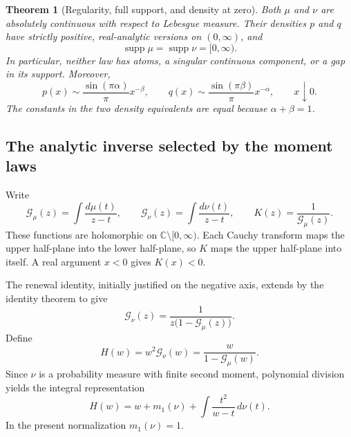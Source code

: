 \documentclass[11pt]{article}
\numberwithin{equation}{section}
\newtheorem{theorem}{Theorem}[section]
\theoremstyle{definition}
\theoremstyle{remark}
\begin{document}
\begin{theorem}[Regularity, full support, and density at zero]
\label{gdy:reg:thm:main}
Both $\mu$ and $\nu$ are absolutely continuous with respect to Lebesgue
measure.  Their densities $p$ and $q$ have strictly positive,
real-analytic versions on $(0,\infty)$, and
\begin{equation}\label{gdy:reg:eq:fullsupport}
 \operatorname{supp}\mu=\operatorname{supp}\nu=[0,\infty).
\end{equation}
In particular, neither law has atoms, a singular continuous component,
or a gap in its support.  Moreover,
\begin{equation}\label{gdy:reg:eq:densitieszero}
 p(x)\sim\frac{\sin(\pi\alpha)}{\pi}x^{-\beta},
 \qquad
 q(x)\sim\frac{\sin(\pi\beta)}{\pi}x^{-\alpha},
 \qquad x\downarrow0.
\end{equation}
The constants in the two density equivalents are equal because
$\alpha+\beta=1$.
\end{theorem}

\subsection{The analytic inverse selected by the moment laws}
\label{gdy:reg:subsec:transforms}

Write
\[
 \mathcal G_\mu(z)=\int\frac{d\mu(t)}{z-t},\qquad
 \mathcal G_\nu(z)=\int\frac{d\nu(t)}{z-t},\qquad
 K(z)=\frac1{\mathcal G_\mu(z)}.
\]
These functions are holomorphic on
$\mathbb C\setminus[0,\infty)$.  Each Cauchy transform maps the upper
half-plane into the lower half-plane, so $K$ maps the upper half-plane
into itself.  A real argument $x<0$ gives $K(x)<0$.

The renewal identity, initially justified on the negative axis, extends
by the identity theorem to give
\begin{equation}\label{gdy:reg:eq:renewalCauchy}
 \mathcal G_\nu(z)
   =\frac1{z\bigl(1-\mathcal G_\mu(z)\bigr)}.
\end{equation}
Define
\begin{equation}\label{gdy:reg:eq:H}
 H(w)=w^2\mathcal G_\nu(w)
      =\frac{w}{1-\mathcal G_\mu(w)}.
\end{equation}
Since $\nu$ is a probability measure with finite second moment,
polynomial division yields the integral representation
\begin{equation}\label{gdy:reg:eq:Hintegral}
 H(w)=w+m_1(\nu)+\int\frac{t^2}{w-t}\,d\nu(t).
\end{equation}
In the present normalization $m_1(\nu)=1$.
\end{document}
